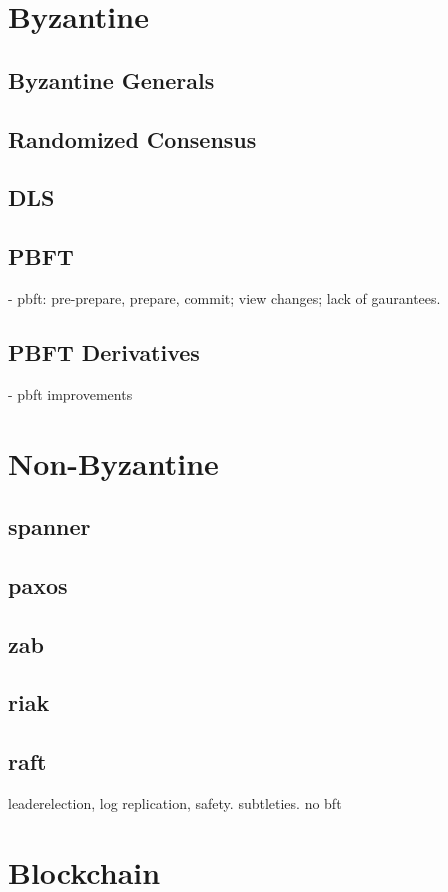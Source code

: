 \section{Byzantine}
	\subsection{Byzantine Generals}
	\subsection{Randomized Consensus}
	\subsection{DLS}
	\subsection{PBFT}
		- pbft: pre-prepare, prepare, commit; view changes; lack of gaurantees.
	\subsection{PBFT Derivatives} 
		- pbft improvements

\section{Non-Byzantine}
	\subsection{spanner}
	\subsection{paxos}
	\subsection{zab}
	\subsection{riak}
	\subsection{raft} leaderelection, log replication, safety. subtleties. no bft

\section{Blockchain}
